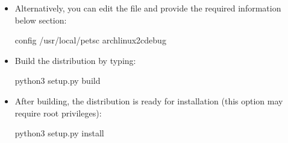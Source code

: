 \documentclass[letterpaper,10pt,english]{sphinxmanual}
\begin{document}
\begin{itemize}
\begin{sphinxVerbatim}[commandchars=\\\{\}]
\PYGZdl{}  /usr/local/petsc
\PYGZdl{}  arch\PYGZhy{}linux2\PYGZhy{}c\PYGZhy{}debug
\end{sphinxVerbatim}

\item {} 
Alternatively, you can edit the file  and provide the required information below \sphinxcode{\sphinxupquote{{[}config{]}}} section:

\begin{sphinxVerbatim}[commandchars=\\\{\}]
\PYG{o}{[}config\PYG{o}{]}
  /usr/local/petsc
  arch\PYGZhy{}linux2\PYGZhy{}c\PYGZhy{}debug
\end{sphinxVerbatim}

\item {} 
Build the distribution by typing:

\begin{sphinxVerbatim}[commandchars=\\\{\}]
\PYGZdl{} python3 setup.py build
\end{sphinxVerbatim}

\item {} 
After building, the distribution is ready for installation (this option may require root privileges):

\begin{sphinxVerbatim}[commandchars=\\\{\}]
\PYGZdl{} python3 setup.py install
\end{sphinxVerbatim}

\end{itemize}
\end{document}
